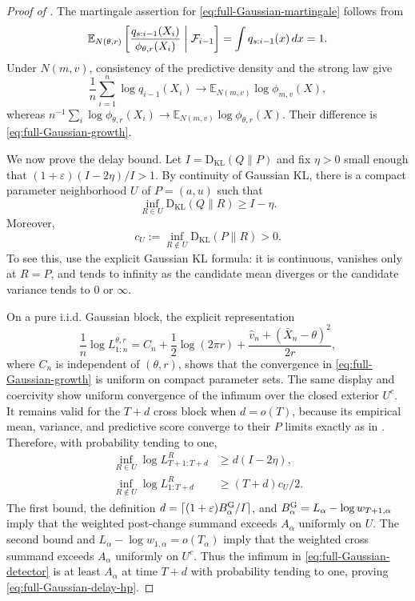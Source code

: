 \documentclass[12pt]{article}
\theoremstyle{spaced}
\theoremstyle{remark}
\newcommand{\E}{\mathbb E}
\newcommand{\KL}{\mathrm{D}_{\text{KL}}}
\begin{document}
\begin{proof}[Proof of ]
The martingale assertion for \eqref{eq:full-Gaussian-martingale} follows from
\[
  \E_{N(\theta,r)}
  \left[
    \frac{q_{s:i-1}(X_i)}{\phi_{\theta,r}(X_i)}
    \biggm|\mathcal F_{i-1}
  \right]
  =\int q_{s:i-1}(x)\,dx=1.
\]
Under $N(m,v)$, consistency of the predictive density and the strong law
give
\[
  \frac1n\sum_{i=1}^n\log q_{i-1}(X_i)
  \to \E_{N(m,v)}\log\phi_{m,v}(X),
\]
whereas
$n^{-1}\sum_i\log\phi_{\theta,r}(X_i)
\to\E_{N(m,v)}\log\phi_{\theta,r}(X)$.  Their difference is
\eqref{eq:full-Gaussian-growth}.

We now prove the delay bound.  Let $I=\KL(Q\|P)$ and fix $\eta>0$ small
enough that $(1+\varepsilon)(I-2\eta)/I>1$.  By continuity of Gaussian KL,
there is a compact parameter neighborhood $U$ of $P=(a,u)$ such that
\begin{equation}
\label{eq:full-G-proof-inside}
  \inf_{R\in U}\KL(Q\|R)\ge I-\eta.
\end{equation}
Moreover,
\begin{equation}
\label{eq:full-G-proof-outside}
  c_U:=\inf_{R\notin U}\KL(P\|R)>0.
\end{equation}
To see this, use the explicit Gaussian KL formula: it is continuous, vanishes
only at $R=P$, and tends to infinity as the candidate mean diverges or the
candidate variance tends to $0$ or $\infty$.

On a pure i.i.d. Gaussian block, the explicit representation
\[
  \frac1n\log L_{1:n}^{\theta,r}
  =C_n+\frac12\log(2\pi r)
    +\frac{\widehat v_n+(\bar X_n-\theta)^2}{2r},
\]
where $C_n$ is independent of $(\theta,r)$, shows that the convergence in
\eqref{eq:full-Gaussian-growth} is uniform on compact parameter sets.  The
same display and coercivity show uniform convergence of the infimum over the
closed exterior $U^c$.  It remains valid for the $T+d$ cross block when
$d=o(T)$, because its empirical mean, variance, and predictive score converge
to their $P$ limits exactly as in .  Therefore,
with probability tending to one,
\begin{align*}
  \inf_{R\in U}
  \log L_{T+1:T+d}^{R}&\ge d(I-2\eta),\\
  \inf_{R\notin U}
  \log L_{1:T+d}^{R}&\ge (T+d)c_U/2.
\end{align*}
The first bound, the definition
$d=\lceil(1+\varepsilon)B_\alpha^{\rm G}/I\rceil$, and
$B_\alpha^{\rm G}=L_\alpha-\log w_{T+1,\alpha}$ imply that the weighted
post-change summand exceeds $A_\alpha$ uniformly on $U$.  The second bound
and $L_\alpha-\log w_{1,\alpha}=o(T_\alpha)$ imply that the weighted cross
summand exceeds $A_\alpha$ uniformly on $U^c$.  Thus the infimum in
\eqref{eq:full-Gaussian-detector} is at least $A_\alpha$ at time $T+d$ with
probability tending to one, proving \eqref{eq:full-Gaussian-delay-hp}.
\end{proof}
\end{document}
